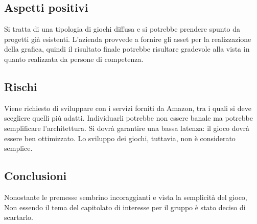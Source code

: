 \documentclass[../studio-di-fattibilita.tex]{subfiles}
\begin{document}
\subsection{Aspetti positivi}%
\label{sub:aspetti_positivi}
Si tratta di una tipologia di giochi diffusa e si potrebbe prendere spunto da progetti già esistenti. 
L’azienda provvede a fornire gli asset per la realizzazione della grafica, quindi il risultato finale potrebbe risultare gradevole alla vista in quanto realizzata da persone di competenza. 

\subsection{Rischi}%
\label{sub:rischi}
Viene richiesto di sviluppare con i servizi forniti da Amazon, tra i quali si deve scegliere quelli più adatti. Individuarli potrebbe non essere banale ma potrebbe semplificare l’architettura. 
Si dovrà garantire una bassa latenza: il gioco dovrà essere ben ottimizzato. Lo sviluppo dei giochi, tuttavia, non è considerato semplice.

\subsection{Conclusioni}%
\label{sub:Conclusioni}
Nonostante le premesse sembrino incoraggianti e vista la semplicità del gioco, Non essendo il tema del capitolato di interesse per il gruppo è stato deciso di scartarlo.
\end{document}
